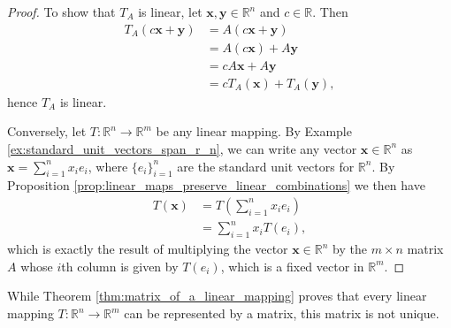 \documentclass[12pt,letterpaper,reqno]{article}
\numberwithin{equation}{section}
\begin{document}
\begin{proof}
	To show that $T_A$ is linear, let $\mathbf{x},\mathbf{y} \in \mathbb{R}^n$ and $c \in \mathbb{R}$. Then
	\begin{align*}
		T_A(c\mathbf{x}+\mathbf{y})&=A(c\mathbf{x}+\mathbf{y}) \\
		&=A(c\mathbf{x})+A\mathbf{y} \\
		&=cA\mathbf{x}+A\mathbf{y} \\
		&=cT_A(\mathbf{x})+T_A(\mathbf{y}),
	\end{align*}
	hence $T_A$ is linear.
	
	Conversely, let $T:\mathbb{R}^n \to \mathbb{R}^m$ be any linear mapping. By Example \ref{ex:standard_unit_vectors_span_r_n}, we can write any vector $\mathbf{x} \in \mathbb{R}^n$ as $\mathbf{x}=\sum_{i=1}^nx_ie_i$, where $\{e_i\}_{i=1}^n$ are the standard unit vectors for $\mathbb{R}^n$. By Proposition \ref{prop:linear_maps_preserve_linear_combinations} we then have
	\begin{align*}
		T(\mathbf{x})&=T\left(\sum_{i=1}^nx_ie_i\right) \\
		&=\sum_{i=1}^nx_iT(e_i),
	\end{align*}
	which is exactly the result of multiplying the vector $\mathbf{x} \in \mathbb{R}^n$ by the $m \times n$ matrix $A$ whose $i$th column is given by $T(e_i)$, which is a fixed vector in $\mathbb{R}^m$. 
\end{proof}
While Theorem \ref{thm:matrix_of_a_linear_mapping} proves that every linear mapping $T:\mathbb{R}^n \to \mathbb{R}^m$ can be represented by a matrix, this matrix is not unique. 
\end{document}
